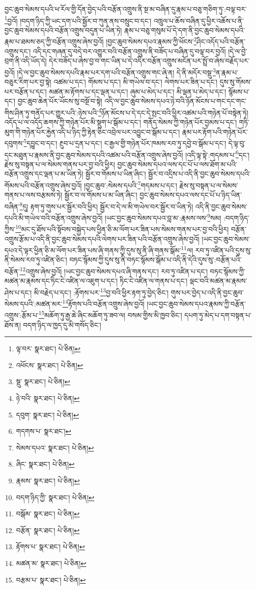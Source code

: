 བྱང་ཆུབ་སེམས་དཔའི་ཕ་རོལ་གྱི་དོན་བྱེད་པའི་བརྩོན་འགྲུས་ནི་སྔ་མ་བཞིན་དུ་རྣམ་པ་བཅུ་གཅིག་ཏུ་:བལྟ་བར་\footnote{ལྟ་བར་  སྣར་ཐང་།  པེ་ཅིན། }བྱའོ། །བདག་ཉིད་ཀྱི་ཡང་དག་པའི་སྦྱོར་བ་ཀུན་ནས་བསྲུང་བ་དང་། འཁྲུལ་པ་ཆོས་བཞིན་དུ་ཕྱིར་འཆོས་པ་ནི་བྱང་ཆུབ་སེམས་དཔའི་བརྩོན་འགྲུས་བདུན་པ་ཡིན་ཏེ། རྣམ་པ་བཅུ་གསུམ་པོ་དེ་དག་ནི་བྱང་ཆུབ་སེམས་དཔའི་རྣམ་པ་ཐམས་ཅད་ཀྱི་བརྩོན་འགྲུས་ཞེས་བྱའོ། །བྱང་ཆུབ་སེམས་དཔའ་རྣམས་ཀྱི་ཕོངས་\footnote{འཕོངས་  སྣར་ཐང་།  པེ་ཅིན། }ཤིང་འདོད་པའི་བརྩོན་འགྲུས་དང་། འདི་དང་གཞན་དུ་བདེ་བར་འགྱུར་བའི་བརྩོན་འགྲུས་ནི་བཟོད་པ་བཞིན་དུ་བལྟ་བར་བྱའོ། །དེ་ལ་བྱེ་བྲག་ནི་འདི་ཡོད་དེ། དེར་བཟོད་པ་ཞེས་བྱ་བ་གང་ཡིན་པ་དེ་འདིར་བརྩོན་འགྲུས་མངོན་པར་སྤྲོ་བ་ཞེས་བརྗོད་པར་བྱའོ། །དེ་ལ་བྱང་ཆུབ་སེམས་དཔའི་རྣམ་པར་དག་པའི་བརྩོན་འགྲུས་གང་ཞེ་ན། དེ་ནི་མདོར་བསྡུ་\footnote{སྡུ་  སྣར་ཐང་།  པེ་ཅིན། }ན་རྣམ་པ་བཅུར་རིག་པར་བྱ་སྟེ། འཚམ་པ་དང་། གོམས་པ་དང་། མི་གཡེལ་བ་དང་། ལེགས་པར་ཟིན་པ་དང་། དུས་སུ་གོམས་པར་བརྩོན་པ་དང་། མཚན་མ་རྟོགས་པ་དང་ལྡན་པ་དང་། ཞུམ་པ་མེད་པ་དང་། མི་ལྡན་པ་མེད་པ་དང་། སྙོམས་པ་དང་། བྱང་ཆུབ་ཆེན་པོར་ཡོངས་སུ་བསྔོ་བ་སྟེ། འདི་ལ་བྱང་ཆུབ་སེམས་དཔའ་ཉེ་བའི་ཉོན་མོངས་པ་གང་དང་གང་གིས་ཤིན་ཏུ་གནོད་པར་གྱུར་པའི་:ཉེས་པའི་\footnote{ཉེ་བའི་  སྣར་ཐང་།  པེ་ཅིན། }ཉོན་མོངས་པ་དེ་དང་དེ་སྤང་བའི་ཕྱིར་འཚམ་པའི་གཉེན་པོ་བསྟེན་ཏེ། འདོད་པ་ལ་འདོད་ཆགས་ཀྱི་གཉེན་པོར་མི་སྡུག་པ་སྒོམ་པ་དང་། གནོད་སེམས་ཀྱི་གཉེན་པོར་བྱམས་པ་དང་། གཏི་མུག་གི་གཉེན་པོར་རྐྱེན་འདི་པ་ཉིད་ཀྱི་རྟེན་ཅིང་འབྲེལ་པར་འབྱུང་བ་སྒོམ་པ་དང་། རྣམ་པར་རྟོག་པའི་གཉེན་པོར་དབུགས་\footnote{དབུག་  སྣར་ཐང་།  པེ་ཅིན། }དབྱུང་བ་དང་། རྔུབ་པ་དྲན་པ་དང་། ང་རྒྱལ་གྱི་གཉེན་པོར་ཁམས་རབ་ཏུ་དབྱེ་བ་སྒོམ་པ་དང་། དེ་ལྟ་བུ་དང་མཐུན་པ་རྣམས་ནི་བྱང་ཆུབ་སེམས་དཔའི་འཚམ་པའི་བརྩོན་འགྲུས་ཞེས་བྱའོ། །འདི་ལྟ་སྟེ་:གདམས་པ་\footnote{གདགས་པ་  སྣར་ཐང་། }དང་། རྗེས་སུ་བསྟན་པ་ལ་སེམས་གནས་པར་བྱ་བའི་ཕྱིར། བྱང་ཆུབ་སེམས་དཔའ་ལས་དང་པོ་པ་ལས་ཐོག་མ་པའི་བརྩོན་འགྲུས་དང་ལྡན་པ་མ་ཡིན་ཏེ། སྦྱོར་བ་གོམས་པ་ཡིན་ཞིང་། སྦྱོར་བ་འདྲིས་པ་འདི་ནི་བྱང་ཆུབ་སེམས་དཔའི་གོམས་པའི་བརྩོན་འགྲུས་ཞེས་བྱའོ། །བྱང་ཆུབ་:སེམས་དཔའི་\footnote{སེམས་དཔའ་  སྣར་ཐང་།  པེ་ཅིན། }གདམས་པ་དང་། རྗེས་སུ་བསྟན་པ་ལ་སེམས་གནས་པ་ལས་བརྩམས་ཏེ། སྦྱོར་བ་ལ་གོམས་པ་མ་ཡིན་ཞིང་། བྱང་ཆུབ་སེམས་དཔའ་ལས་དང་པོ་པ་ཉིད་ཡིན་བཞིན་\footnote{ཞིང་  སྣར་ཐང་།  པེ་ཅིན། }དུ། རྟག་ཏུ་གུས་པར་སྦྱོར་བའི་ཕྱིར། སྦྱོར་བ་དེ་ལ་མི་གཡེལ་བར་སྦྱོར་བ་ཡིན་ཏེ། འདི་ནི་བྱང་ཆུབ་སེམས་དཔའི་མི་གཡེལ་བའི་བརྩོན་འགྲུས་ཞེས་བྱའོ། །ཡང་བྱང་ཆུབ་སེམས་དཔའ་བླ་མ་:རྣམས་ལས་\footnote{རྣམས་  སྣར་ཐང་།  པེ་ཅིན། }སམ། :བདག་ཉིད་ཀྱིས་\footnote{བདག་ཉིད་ཀྱི་  སྣར་ཐང་།  པེ་ཅིན། }མང་དུ་ཐོས་པའི་སྟོབས་བསྐྱེད་པས་ཕྱིན་ཅི་མ་ལོག་པར་ཟིན་པས་སེམས་གནས་པར་བྱ་བའི་ཕྱིར། བརྩོན་འགྲུས་རྩོམ་པ་འདི་ནི་བྱང་ཆུབ་སེམས་དཔའི་ལེགས་པར་ཟིན་པའི་བརྩོན་འགྲུས་ཞེས་བྱའོ། །ཡང་བྱང་ཆུབ་སེམས་དཔའ་དེ་ལྟར་ཕྱིན་ཅི་མ་ལོག་པར་ཟིན་པས་ཞི་གནས་ཀྱི་དུས་སུ་ནི་ཞི་གནས་སྒོམ་\footnote{བསྒོམ་  སྣར་ཐང་།  པེ་ཅིན། }ལ། རབ་ཏུ་འཛིན་པའི་དུས་སུ་ནི་སེམས་རབ་ཏུ་འཛིན་ཅིང་། བཏང་སྙོམས་ཀྱི་དུས་སུ་ནི་བཏང་སྙོམས་སྒོམ་པ་འདི་ནི་དེའི་དུས་སུ་:བརྩོན་པའི་བརྩོན་\footnote{བརྩོན་  སྣར་ཐང་།  པེ་ཅིན། }འགྲུས་ཞེས་བྱའོ། །ཡང་བྱང་ཆུབ་སེམས་དཔའ་ཞི་གནས་དང་། རབ་ཏུ་འཛིན་པ་དང་། བཏང་སྙོམས་ཀྱི་མཚན་མ་རྣམས་དང་ཏིང་ངེ་འཛིན་ལ་འཇུག་པ་དང་། ཏིང་ངེ་འཛིན་ལ་གནས་པ་དང་། ལྡང་བའི་མཚན་མ་རྣམས་ཤེས་པ་དང་། མི་བརྗེད་པ་དང་། :རྟོགས་པར་\footnote{རྟོགས་པ་  སྣར་ཐང་།  པེ་ཅིན། }བྱ་བའི་ཕྱིར་རྟག་ཏུ་བྱེད་ཅིང་། གུས་པར་བྱེད་པ་འདི་ནི་བྱང་ཆུབ་སེམས་དཔའི་:མཚན་མར་\footnote{མཚན་མ་  སྣར་ཐང་།  པེ་ཅིན། }རྟོགས་པའི་བརྩོན་འགྲུས་ཞེས་བྱའོ། །ཡང་བྱང་ཆུབ་སེམས་དཔའ་རྣམས་ཀྱི་བརྩོན་འགྲུས་:རྩོམ་པ་\footnote{བརྩམ་པ་  སྣར་ཐང་།  པེ་ཅིན། }མཆོག་ཏུ་རྒྱ་ཆེ་ཞིང་མཆོག་ཏུ་ཟབ་ལ། བསམ་གྱིས་མི་ཁྱབ་ཅིང་། དཔག་ཏུ་མེད་པ་དག་བསྟན་པ་ཐོས་ན། བདག་ཉིད་ལ་ཁྱད་དུ་མི་གསོད་ཅིང་། 